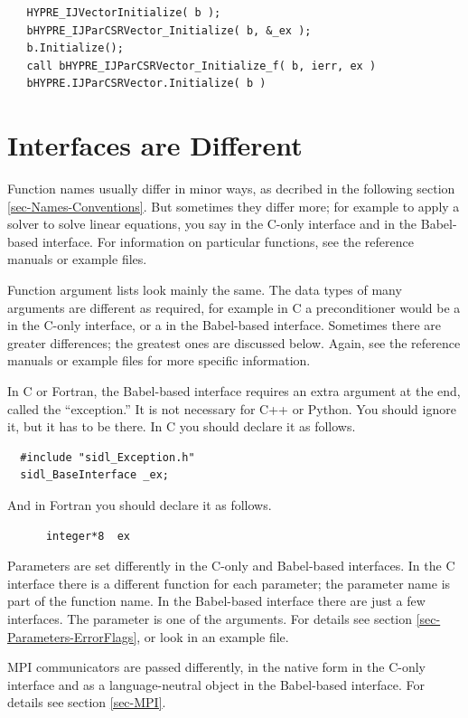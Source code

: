 \begin{verbatim}
   HYPRE_IJVectorInitialize( b );
   bHYPRE_IJParCSRVector_Initialize( b, &_ex );
   b.Initialize();
   call bHYPRE_IJParCSRVector_Initialize_f( b, ierr, ex )
   bHYPRE.IJParCSRVector.Initialize( b )
\end{verbatim}


\section{Interfaces are Different}
\label{sec-Interfaces-Different}

Function names usually differ in minor ways, as decribed in the
following section \ref{sec-Names-Conventions}.  But sometimes they
differ more; for example to apply a solver to solve linear equations,
you say  in the C-only interface and  in the
Babel-based interface.  For information on particular functions, see
the reference manuals or example files.

Function argument lists look mainly the same.  The data types of many
arguments are different as required, for example in C a preconditioner
would be a  in the C-only interface, or a
 in the Babel-based interface.  Sometimes there
are greater differences; the greatest ones are discussed below.
Again, see the reference manuals or example files for more specific
information.

In C or Fortran, the Babel-based interface requires an extra argument
at the end, called the ``exception.''  It is not necessary for C++ or
Python.  You should ignore it, but it has to be there.  In C you
should declare it as follows.
\begin{verbatim}
  #include "sidl_Exception.h"
  sidl_BaseInterface _ex;
\end{verbatim}
And in Fortran you should declare it as follows.
\begin{verbatim}
      integer*8  ex
\end{verbatim}

Parameters are set differently in the C-only and Babel-based
interfaces.  In the C interface there is a different 
function for each parameter; the parameter name is part of the
function name.  In the Babel-based interface there are just a few
 interfaces.  The parameter is one of the
arguments.  For details see section
\ref{sec-Parameters-ErrorFlags}, or look in an example file.

MPI communicators are passed differently, in the native form in the
C-only interface and as a language-neutral object in the Babel-based
interface.  For details see section \ref{sec-MPI}.

